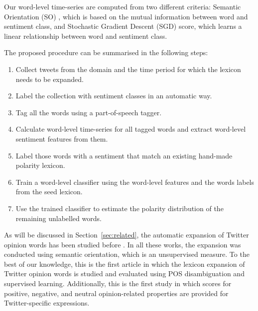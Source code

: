 \documentclass{sig-alternate}
\begin{document}


Our word-level time-series are computed from two different criteria: Semantic Orientation (SO) \cite{Turney2002}, which is based on the mutual information between word and sentiment class, and Stochastic Gradient Descent (SGD) score, which learns a linear relationship between word and sentiment class.

The proposed procedure can be summarised in the following steps:

\begin{enumerate}
\item Collect tweets from the domain and the time period for which the lexicon needs to be expanded. 
\item Label the collection with sentiment classes in an automatic way.
\item Tag all the words using a part-of-speech tagger.
\item Calculate word-level time-series for all tagged words and extract word-level sentiment features from them.
\item Label those words with a sentiment that match an existing hand-made polarity lexicon.
\item Train a word-level classifier using the word-level features and the words labels from the seed lexicon.
\item Use the trained classifier to estimate the polarity distribution of the remaining unlabelled words.
\end{enumerate}
 
As will be discussed in Section~\ref{sec:related}, the automatic expansion of Twitter  opinion words has been studied before \cite{avaya2013,Mohammad2013,Zhou2014}. In all these works, the expansion was conducted using semantic orientation, which is an unsupervised measure.  
To the best of our knowledge, this is the first article in which the lexicon expansion of Twitter opinion words is studied and evaluated using POS disambiguation and supervised learning. Additionally, this is the first study in which scores for positive, negative, and neutral opinion-related properties are provided for Twitter-specific expressions.
\end{document}
